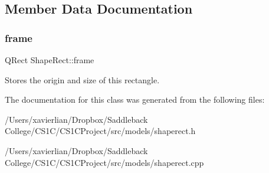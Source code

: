 \subsection{Member Data Documentation}
\mbox{\label{class_shape_rect_a238099eccd2cd32a7e82cb1719b36b51}} 
\subsubsection{\texorpdfstring{frame}{frame}}
{\footnotesize\ttfamily Q\+Rect Shape\+Rect\+::frame}

Stores the origin and size of this rectangle. 

The documentation for this class was generated from the following files\+:\begin{DoxyCompactItemize}
\item 
/\+Users/xavierlian/\+Dropbox/\+Saddleback College/\+C\+S1\+C/\+C\+S1\+C\+Project/src/models/shaperect.\+h\item 
/\+Users/xavierlian/\+Dropbox/\+Saddleback College/\+C\+S1\+C/\+C\+S1\+C\+Project/src/models/shaperect.\+cpp\end{DoxyCompactItemize}
